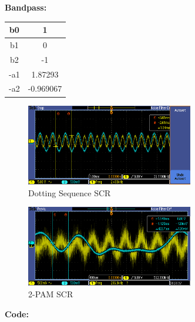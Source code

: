 \documentclass{article}
\begin{document}
\textbf{Bandpass:}

\begin{center}
\begin{tabular}{c|c}
b0	&	 1				\\ \hline
b1	&  0				\\ \hline
b2	& -1				\\ \hline
-a1	&	 1.87293\\ \hline
-a2	&	-0.969067
\end{tabular}
\end{center}

\begin{figure}[h]
  \begin{center}
    \includegraphics[width=0.65\textwidth]{img/dotting_sequence_SCR.png}
    \caption{Dotting Sequence SCR}
  \end{center}
\end{figure}

\begin{figure}[h]
  \begin{center}
    \includegraphics[width=0.65\textwidth]{img/2PAM_SCR.png}
    \caption{2-PAM SCR}
  \end{center}
\end{figure}

\pagebreak
\textbf{Code:}
\end{document}
